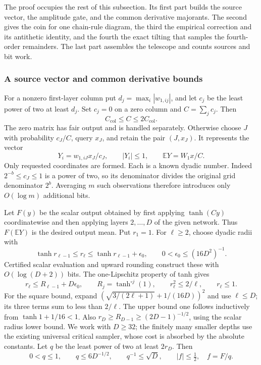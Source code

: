 The proof occupies the rest of this subsection. Its first part builds
the source vector, the amplitude gate, and the common derivative
majorants. The second gives the coin for one chain-rule diagram, the
third the empirical correction and its antithetic identity, and the
fourth the exact tilting that samples the fourth-order remainders. The
last part assembles the telescope and counts sources and bit work.

\subsubsection{A source vector and common derivative bounds}

For a nonzero first-layer column put $d_j=\max_i|w_{1,ij}|$, and let
$c_j$ be the least power of two at least $d_j$.  Set $c_j=0$ on a zero
column and $C=\sum_jc_j$.  Then
\[
 C_{\mathrm{col}}\le C\le2C_{\mathrm{col}}.
\]
The zero matrix has fair output and is handled separately.  Otherwise
choose $J$ with probability $c_J/C$, query $x_J$, and retain the pair
$(J,x_J)$.  It represents the vector
\begin{equation}
 Y_i=w_{1,iJ}x_J/c_J,\qquad |Y_i|\le1,
 \qquad \mathbb E Y=W_1x/C.
 \label{eq:column-vector-source}
\end{equation}
Only requested coordinates are formed.  Each is a known dyadic number.
Indeed $2^{-b}\le c_J\le1$ is a power of two, so its denominator divides
the original grid denominator $2^b$.  Averaging $m$ such observations
therefore introduces only $O(\log m)$ additional bits.

Let $F(y)$ be the scalar output obtained by first applying
$\tanh(Cy)$ coordinatewise and then applying layers $2,\ldots,D$ of
the given network.  Thus $F(\mathbb E Y)$ is the desired output mean.
Put $r_1=1$.  For $\ell\ge2$, choose dyadic radii with
\[
 \tanh r_{\ell-1}\le r_\ell
          \le\tanh r_{\ell-1}+\epsilon_0,
 \qquad 0<\epsilon_0\le(16D^2)^{-1}.
\]
Certified scalar evaluation and upward rounding construct these with
$O(\log(D+2))$ bits.  The one-Lipschitz property of tanh gives
\[
 r_\ell\le R_{\ell-1}+D\epsilon_0,
 \qquad R_j=\tanh^{\circ j}(1),
 \qquad r_\ell^2\le2/\ell,\qquad r_\ell\le1.
\]
For the square bound, expand
$(\sqrt{3/(2\ell+1)}+1/(16D))^2$ and use $\ell\le D$; its
three terms sum to less than $2/\ell$.  The upper bound one follows
inductively from $\tanh1+1/16<1$.  Also
$r_D\ge R_{D-1}\ge(2D-1)^{-1/2}$, using the scalar radius lower
bound.  We work with $D\ge32$; the finitely many smaller depths use
the existing universal critical sampler, whose cost is absorbed by the
absolute constants.  Let $q$ be the least power of two at
least $2r_D$.  Then
\begin{equation}
 0<q\le1,\qquad q\le6D^{-1/2},\qquad q^{-1}\le\sqrt D,
 \qquad |f|\le\tfrac12,\quad f=F/q.
 \label{eq:column-top-gate}
\end{equation}


